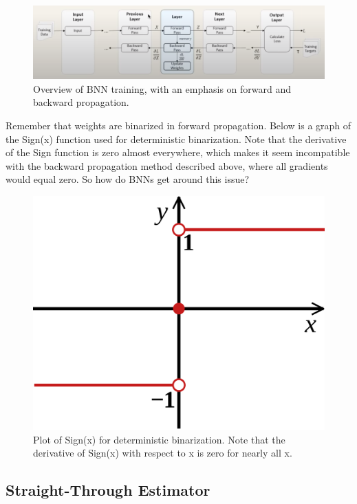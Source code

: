 \begin{figure}[htbp]
\centerline{\includegraphics[scale = .35]{images/network_overview.png}}
\caption{Overview of BNN training, with an emphasis on forward and backward propagation.}
\label{fig:network_overview}
\end{figure}


Remember that weights are binarized in forward propagation. Below is a graph of the Sign(x) function used for deterministic binarization. Note that the derivative of the Sign function is zero almost everywhere, which makes it seem incompatible with the backward propagation method described above, where all gradients would equal zero. So how do BNNs get around this issue?


\begin{figure}
\centerline{\includegraphics[scale = .15]{images/sign.png}}
\caption{Plot of Sign(x) for deterministic binarization. Note that the derivative of Sign(x) with respect to x is zero for nearly all x.}
\label{fig:sign}
\end{figure}


\subsection{Straight-Through Estimator}


